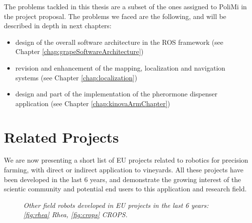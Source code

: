 The problems tackled in this thesis are a subset of the ones assigned to PoliMi in the project proposal. The problems we faced are the following, and will be described in depth in next chapters:
\begin{itemize}
	\item design of the overall software architecture in the \ac{ROS} framework (see Chapter \ref{chap:grapeSoftwareArchitecture})
	\item revision and enhancement of the mapping, localization and navigation systems (see Chapter \ref{chap:localization})
	\item design and part of the implementation of the pherormone dispenser application (see Chapter \ref{chap:kinovaArmChapter})
\end{itemize}

\section{Related Projects} \label{sec:relatedProjects}

We are now presenting a short list of EU projects related to robotics for precision farming, with direct or indirect application to vineyards. All these projects have been developed in the last 6 years, and demonstrate the growing interest of the scientic community and potential end users to this application and research field.

\begin{figure}
	\centering
	\qquad
	\caption{\textit{Other field robots developed in EU projects in the last 6 years: \ref{fig:rhea} Rhea, \ref{fig:crops} CROPS.}}
\end{figure}

